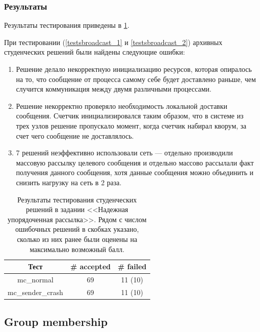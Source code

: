 \documentclass[a4paper,12pt]{extarticle}
\begin{document}
\subsubsection{Результаты}

Результаты тестирования приведены в \cref{tab6}.

При тестировании (\cref{testsbroadcast_1} и \ref{testsbroadcast_2}) архивных студенческих решений были найдены следующие ошибки:
\begin{enumerate}
    \item Решение делало некорректную инициализацию ресурсов, которая опиралось на то, что сообщение от процесса самому себе будет доставлено раньше, чем случится коммуникация между двумя различными процессами.
    \item Решение некорректно проверяло необходимость локальной доставки сообщения. Счетчик инициализировался таким образом, что в системе из трех узлов решение пропускало момент, когда счетчик набирал кворум, за счет чего сообщение не доставлялось.
    \item 7 решений неэффективно использовали сеть --- отдельно производили массовую рассылку целевого сообщения и отдельно массово рассылали факт получения данного сообщения, хотя данные сообщения можно объединить и снизить нагрузку на сеть в 2 раза.
\end{enumerate} 

\begin{table}[htbp]
    \caption{Результаты тестирования студенческих решений в задании <<Надежная упорядоченная рассылка>>. Рядом с числом ошибочных решений в скобках указано, сколько из них ранее были оценены на максимально возможный балл. }
    \begin{center}
    \begin{tabular}{|c|c|c|}
    \hline
    \textbf{Тест} & \textbf{\# accepted} & \textbf{\# failed}  \\
    \hline
    mc\_normal  & 69 & 11 (10) \\
    \hline
    mc\_sender\_crash & 69 & 11 (10) \\
    \hline

    \end{tabular}
    \label{tab6}
    \end{center}
\end{table}

\subsection{Group membership}
\label{MEMBERSHIP}
\end{document}
